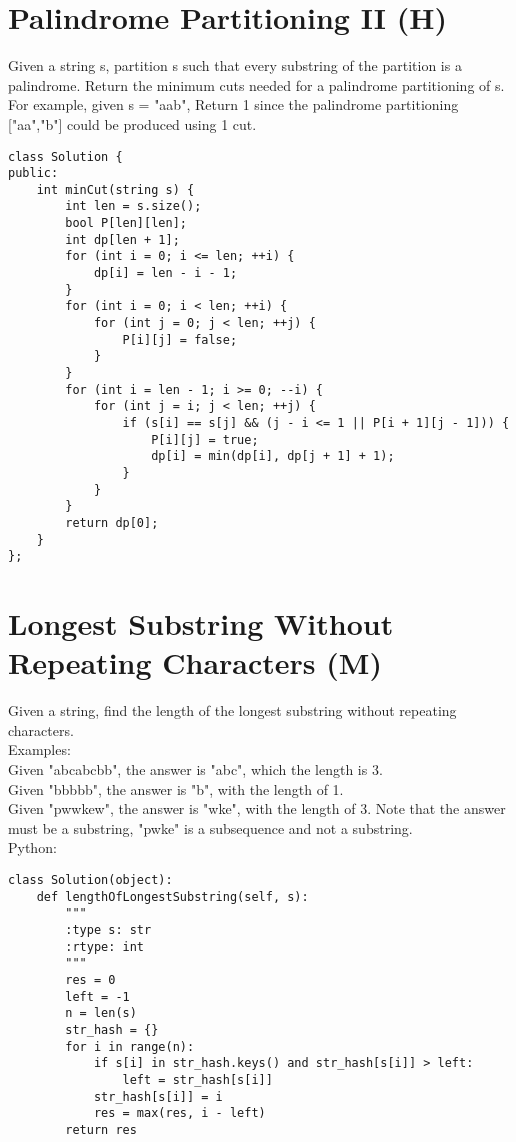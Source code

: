 \section{Palindrome Partitioning II (H)}
Given a string s, partition s such that every substring of the partition is a palindrome. Return the minimum cuts needed for a palindrome partitioning of s. \\

For example, given s = "aab",
Return 1 since the palindrome partitioning ["aa","b"] could be produced using 1 cut. \\

\begin{lstlisting}
class Solution {
public:
    int minCut(string s) {
        int len = s.size();
        bool P[len][len];
        int dp[len + 1];
        for (int i = 0; i <= len; ++i) {
            dp[i] = len - i - 1;
        }
        for (int i = 0; i < len; ++i) {
            for (int j = 0; j < len; ++j) {
                P[i][j] = false;
            }
        }
        for (int i = len - 1; i >= 0; --i) {
            for (int j = i; j < len; ++j) {
                if (s[i] == s[j] && (j - i <= 1 || P[i + 1][j - 1])) {
                    P[i][j] = true;
                    dp[i] = min(dp[i], dp[j + 1] + 1);
                }
            }
        }
        return dp[0];
    }
};
\end{lstlisting}


\section{Longest Substring Without Repeating Characters (M)}
Given a string, find the length of the longest substring without repeating characters.\\

Examples:\\
Given "abcabcbb", the answer is "abc", which the length is 3.\\
Given "bbbbb", the answer is "b", with the length of 1.\\
Given "pwwkew", the answer is "wke", with the length of 3. Note that the answer must be a substring, "pwke" is a subsequence and not a substring.\\

Python:
\lstset{language=python}
\begin{lstlisting}
class Solution(object):
    def lengthOfLongestSubstring(self, s):
        """
        :type s: str
        :rtype: int
        """
        res = 0
        left = -1
        n = len(s)
        str_hash = {}
        for i in range(n):
            if s[i] in str_hash.keys() and str_hash[s[i]] > left:
                left = str_hash[s[i]]
            str_hash[s[i]] = i
            res = max(res, i - left)
        return res
\end{lstlisting}

